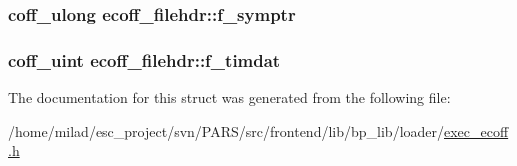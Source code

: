 \label{structecoff__filehdr_a3caac3fb501a963bfba324a21709ab65}
\hypertarget{structecoff__filehdr_a2cd3ccadbb8604f38b24b038cf8559c6}{
\subsubsection[{f\_\-symptr}]{\setlength{\rightskip}{0pt plus 5cm}coff\_\-ulong {\bf ecoff\_\-filehdr::f\_\-symptr}}}
\label{structecoff__filehdr_a2cd3ccadbb8604f38b24b038cf8559c6}
\hypertarget{structecoff__filehdr_aa5fd02a3c9926125af96c38f41090a7e}{
\subsubsection[{f\_\-timdat}]{\setlength{\rightskip}{0pt plus 5cm}coff\_\-uint {\bf ecoff\_\-filehdr::f\_\-timdat}}}
\label{structecoff__filehdr_aa5fd02a3c9926125af96c38f41090a7e}


The documentation for this struct was generated from the following file:\begin{DoxyCompactItemize}
\item 
/home/milad/esc\_\-project/svn/PARS/src/frontend/lib/bp\_\-lib/loader/\hyperlink{exec__ecoff_8h}{exec\_\-ecoff.h}\end{DoxyCompactItemize}
